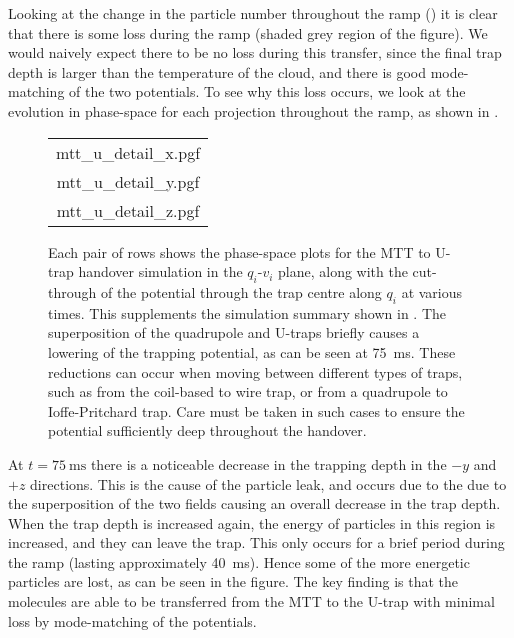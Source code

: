 Looking at the change in the particle number throughout the ramp
() it is clear that there is some loss
during the ramp (shaded grey region of the figure). We would naively expect
there to be no loss during this transfer, since the final trap depth is larger
than the temperature of the cloud, and there is good mode-matching of the two
potentials. To see why this loss occurs, we  look at the evolution in
phase-space for each projection throughout the ramp, as shown in
.

\begin{figure}[htp]
\centering
  \begin{tabular}{c}
  {mtt_u_detail_x.pgf} \\
  {mtt_u_detail_y.pgf} \\
  {mtt_u_detail_z.pgf}
  \end{tabular}
  \caption{
    Each pair of rows shows the phase-space plots for the MTT to U-trap
    handover simulation in the $q_i$-$v_i$ plane, along with the cut-through of
    the potential through the trap centre along $q_i$ at various times. This
    supplements the simulation summary shown in .
    The superposition of the quadrupole and U-traps briefly causes a lowering
    of the trapping potential, as can be seen at \SI{75}{\milli\second}. These
    reductions can occur when moving between different types of traps, such as
    from the coil-based to wire trap, or from a quadrupole to Ioffe-Pritchard
    trap. Care must be taken in such cases to ensure the potential sufficiently
    deep throughout the handover.
}
  \label{design:fig:mttudetail}
\end{figure}

At $t=\SI{75}{\milli\second}$ there is a noticeable decrease in the trapping
depth in the $-y$ and $+z$ directions. This is the cause of the particle leak,
and occurs due to the due to the superposition of the two fields causing an
overall decrease in the trap depth. When the trap depth is increased again, the
energy of particles in this region is increased, and they can leave the trap.
This only occurs for a brief period during the ramp (lasting approximately
\SI{40}{\milli\second}).  Hence some of the more energetic particles are lost,
as can be seen in the figure. The key finding is that the molecules are able to
be transferred from the MTT to the U-trap with minimal loss by mode-matching of
the potentials.

